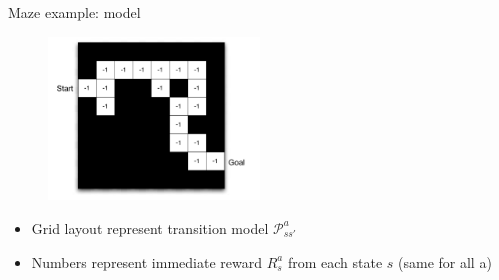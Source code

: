 \bgroup
\begin{frame}{Maze example: model}
\begin{figure}
\centering
\includegraphics[width=0.5\textwidth]{img/maze_model.pdf}
\end{figure}
\begin{itemize}
\item Grid layout represent transition model $\mathcal{P}_{ss'}^a$
\item Numbers represent immediate reward $R_s^a$ from each state $s$ (same for all a)
\end{itemize}
\end{frame}
\egroup